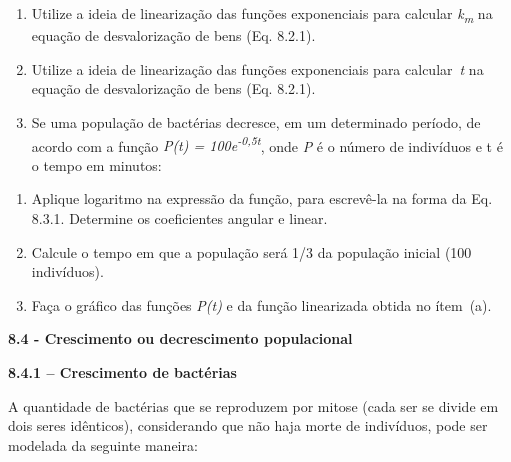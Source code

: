 \documentclass[12pt]{article}
\begin{document}
\vspace{\baselineskip}
\begin{enumerate}
	\item Utilize a ideia de linearização das funções exponenciais para calcular \textit{k\textsubscript{m}} na equação de desvalorização de bens (Eq. 8.2.1).\par

	\item Utilize a ideia de linearização das funções exponenciais para calcular\  \textit{t }na equação de desvalorização de bens (Eq. 8.2.1).\par

	\item Se uma população de bactérias decresce, em um determinado período, de acordo com a função \textit{P(t) = 100e\textsuperscript{-0,5t}}, onde \textit{P} é o número de indivíduos e t é o tempo em minutos:
\end{enumerate}\par

\begin{enumerate}
	\item Aplique logaritmo na expressão da função, para escrevê-la na forma da Eq. 8.3.1. Determine os coeficientes angular e linear.\par

	\item Calcule o tempo em que a população será 1/3 da população inicial (100 indivíduos).\par

	\item Faça o gráfico das funções \textit{P(t)} e da função linearizada obtida no ítem\ (a).  
\end{enumerate}\par


\vspace{\baselineskip}
{\fontsize{14pt}{16.8pt}\selectfont \textbf{8.4 - Crescimento ou decrescimento populacional}\par}\par


\vspace{\baselineskip}
{\fontsize{14pt}{16.8pt}\selectfont \textbf{8.4.1 – Crescimento de bactérias }\par}\par

A quantidade de bactérias que se reproduzem por mitose (cada ser se divide em dois seres idênticos), considerando que não haja morte de indivíduos, pode ser modelada da seguinte maneira: \par
\end{document}
